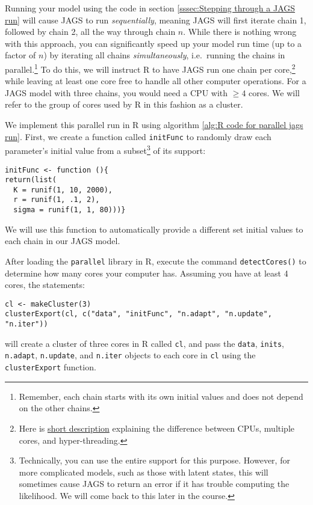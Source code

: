 \documentclass[12pt,english]{article}
\begin{document}
Running your model using the code in section \ref{sssec:Stepping through a JAGS run} will cause JAGS to run \emph{sequentially}, meaning JAGS will first iterate chain 1, followed by chain 2, all the way through chain $n$. While there is nothing wrong with this approach, you can significantly speed up your model run time (up to a factor of $n$) by iterating all chains \emph{simultaneously}, i.e.\ running the chains in parallel.\footnote{Remember, each chain starts with its own initial values and does not depend on the other chains.} To do this, we will instruct R to have JAGS run one chain per core,\footnote{Here is \href{http://www.howtogeek.com/194756/cpu-basics-multiple-cpus-cores-and-hyper-threading-explained/}{short description} explaining the difference between CPUs, multiple cores, and hyper-threading.} while leaving at least one core free to handle all other computer operations. For a JAGS model with three chains, you would need a CPU with $\geq 4$ cores. We will refer to the group of cores used by R in this fashion as a cluster.

We implement this parallel run in R using algorithm \ref{alg:R code for parallel jags run}. First, we create a function called \texttt{initFunc} to randomly draw each parameter's initial value from a subset\footnote{Technically, you can use the entire support for this purpose. However, for more complicated models, such as those with latent states, this will sometimes cause JAGS to return an error if it has trouble computing the likelihood. We will come back to this later in the course.} of its support:

\begin{Verbatim}
initFunc <- function (){
return(list(
  K = runif(1, 10, 2000),
  r = runif(1, .1, 2),
  sigma = runif(1, 1, 80)))}
\end{Verbatim}

\noindent We will use this function to automatically provide a different set initial values to each chain in our JAGS model.

After loading the \texttt{parallel} library in R, execute the command \texttt{detectCores()} to determine how many cores your computer has. Assuming you have at least 4 cores, the statements:

\begin{Verbatim}
cl <- makeCluster(3)
clusterExport(cl, c("data", "initFunc", "n.adapt", "n.update", "n.iter")) 
\end{Verbatim}

\noindent will create a cluster of three cores in R called \texttt{cl}, and pass the \texttt{data}, \texttt{inits}, \texttt{n.adapt}, \texttt{n.update}, and \texttt{n.iter} objects to each core in \texttt{cl} using the \texttt{clusterExport} function. 
\end{document}

